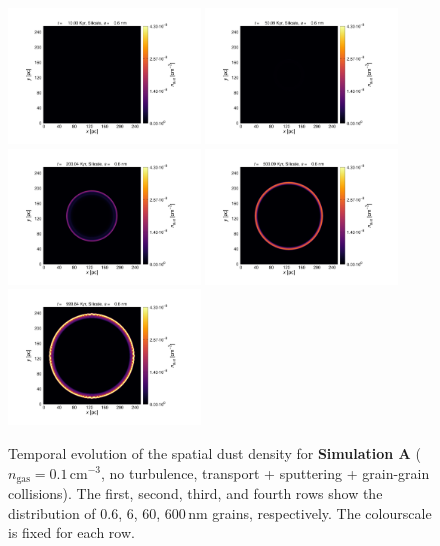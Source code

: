 \documentclass[fleqn,usenatbib]{mnras}
\begin{document}
\begin{figure}
  \includegraphics[trim=2.8cm 1.5cm 9.3cm 2.0cm, clip=true,page=4,height = 3.6cm]{Pics/Pics_A2/Density_1_00041.pdf}\hspace*{-0.05cm} 
 \includegraphics[trim=5.2cm 1.5cm 9.3cm 2.0cm, clip=true,page=4,height = 3.6cm]{Pics/Pics_A2/Density_1_00201.pdf}\hspace*{-0.05cm} 
 \includegraphics[trim=5.2cm 1.5cm 9.3cm 2.0cm, clip=true,page=4,height = 3.6cm]{Pics/Pics_A2/Density_1_00801.pdf}\hspace*{-0.05cm}  
 \includegraphics[trim=5.2cm 1.5cm 9.3cm 2.0cm, clip=true,page=4,height = 3.6cm]{Pics/Pics_A2/Density_1_02001.pdf}\hspace*{-0.05cm} 
 \includegraphics[trim=5.2cm 1.5cm 3.2cm 2.0cm, clip=true,page=4,height = 3.6cm]{Pics/Pics_A2/Density_1_04000.pdf}\\
  \caption{Temporal evolution of the spatial dust density for \textbf{Simulation A}  ($n_\text{gas}=0.1\,\text{cm}^{-3}$, no turbulence, transport + sputtering + grain-grain collisions). The first, second, third, and fourth rows show the distribution of 0.6, 6, 60, 600$\,$nm grains, respectively. The colourscale is fixed for each row.}
   \label{fig_A2} 
  \end{figure}   
  
\end{document}
